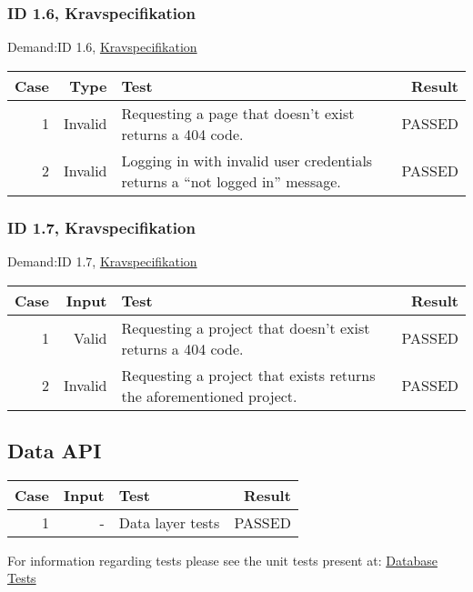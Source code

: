 \documentclass{TDP003mall}
\begin{document}
\subsubsection{ID 1.6, Kravspecifikation}
Demand:ID 1.6, \href{https://www.ida.liu.se/~TDP003/current/projekt/dokument/systemspecifikation.pdf}{Kravspecifikation}
\begin{table}[!h]
\begin{tabularx}{\linewidth}{|r|r|X|r|}\hline
\textbf{Case} & \textbf{Type} & \textbf{Test} & \textbf{Result} \\\hline
1 &Invalid & Requesting a page that doesn't exist returns a 404 code.  & PASSED \\\hline
2 &Invalid & Logging in with invalid user credentials returns a ``not logged in'' message. & PASSED \\\hline
\end{tabularx}
\end{table}



\subsubsection{ID 1.7, Kravspecifikation}
Demand:ID 1.7, \href{https://www.ida.liu.se/~TDP003/current/projekt/dokument/systemspecifikation.pdf}{Kravspecifikation}
\begin{table}[!h]
\begin{tabularx}{\linewidth}{|r|r|X|r|}\hline
\textbf{Case} &\textbf{Input} & \textbf{Test} & \textbf{Result} \\\hline
1 &Valid & Requesting a project that doesn't exist returns a 404 code.  & PASSED \\\hline
2 &Invalid & Requesting a project that exists returns the aforementioned project.  & PASSED \\\hline
\end{tabularx}
\end{table}

\subsection{Data API}
\begin{table}[!h]
\begin{tabularx}{\linewidth}{|r|r|X|r|}\hline
\textbf{Case} &\textbf{Input} & \textbf{Test} & \textbf{Result} \\\hline
1 & -  & Data layer tests  & PASSED \\\hline
\end{tabularx}
\end{table}
For information regarding tests
please see the unit tests present at: \href{https://gitlab.ida.liu.se/filst04/tdp003-2018-database-tests}{Database Tests}
\end{document}
